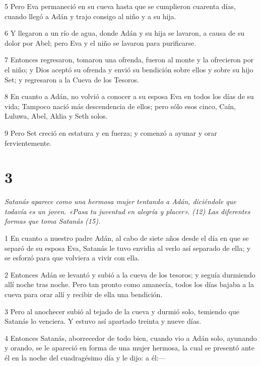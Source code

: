 \par 5 Pero Eva permaneció en su cueva hasta que se cumplieron cuarenta días, cuando llegó a Adán y trajo consigo al niño y a su hija.

\par 6 Y llegaron a un río de agua, donde Adán y su hija se lavaron, a causa de su dolor por Abel; pero Eva y el niño se lavaron para purificarse.

\par 7 Entonces regresaron, tomaron una ofrenda, fueron al monte y la ofrecieron por el niño; y Dios aceptó su ofrenda y envió su bendición sobre ellos y sobre su hijo Set; y regresaron a la Cueva de los Tesoros.

\par 8 En cuanto a Adán, no volvió a conocer a su esposa Eva en todos los días de su vida; Tampoco nació más descendencia de ellos; pero sólo esos cinco, Caín, Luluwa, Abel, Aklia y Seth solos.

\par 9 Pero Set creció en estatura y en fuerza; y comenzó a ayunar y orar fervientemente.

\chapter{3}

\par \textit{Satanás aparece como una hermosa mujer tentando a Adán, diciéndole que todavía es un joven. «Pasa tu juventud en alegría y placer». (12) Las diferentes formas que toma Satanás (15).}

\par 1 En cuanto a nuestro padre Adán, al cabo de siete años desde el día en que se separó de su esposa Eva, Satanás le tuvo envidia al verlo así separado de ella; y se esforzó para que volviera a vivir con ella.

\par 2 Entonces Adán se levantó y subió a la cueva de los tesoros; y seguía durmiendo allí noche tras noche. Pero tan pronto como amanecía, todos los días bajaba a la cueva para orar allí y recibir de ella una bendición.

\par 3 Pero al anochecer subió al tejado de la cueva y durmió solo, temiendo que Satanás lo venciera. Y estuvo así apartado treinta y nueve días.

\par 4 Entonces Satanás, aborrecedor de todo bien, cuando vio a Adán solo, ayunando y orando, se le apareció en forma de una mujer hermosa, la cual se presentó ante él en la noche del cuadragésimo día y le dijo: a él:—

